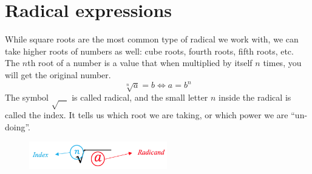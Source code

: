 \section{Radical expressions}
While square roots are the most common type of radical we work with, we can take 
higher roots of numbers as well: cube roots, fourth roots, fifth roots, etc. The 
$n$th root of a number is a value that when multiplied by itself $n$ times, you will 
get the original number. 
		\begin{equation}
					\sqrt[n]{a} = b \Longleftrightarrow a = b^n	
		\end{equation}
The symbol $\sqrt{\quad}$ is called radical, and the small letter $n$ inside the 
radical is called the index. It tells us which root we are taking, or which power we
are “un-doing”.
		\begin{figure}[ht]
				\includegraphics[width=6cm]{pics/radical.png}
				\centering
		\end{figure}
